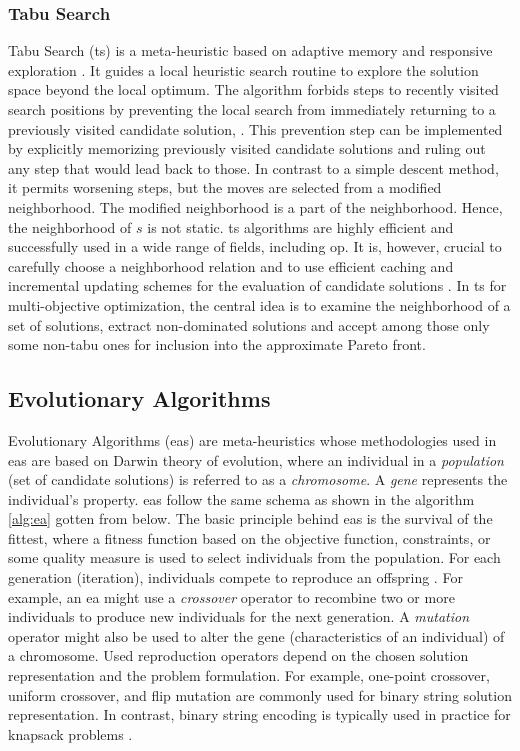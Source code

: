 \subsubsection{Tabu Search}
Tabu Search (\gls{ts}) is a meta-heuristic based on adaptive memory and responsive exploration \parencite{Gonzalez2007HandbookMetaheuristics}. It guides a local heuristic search routine to explore the solution
space beyond the local optimum. The algorithm forbids steps to recently visited search positions by preventing the local search from immediately returning to a previously visited candidate solution, \parencite{HolgerH2005StochasticSearch}. This prevention step can be implemented by explicitly memorizing previously visited candidate solutions and ruling out any step that would lead back to those. In contrast to a simple descent method, it permits worsening steps, but the moves are selected from a modified neighborhood. The modified neighborhood is a part of the neighborhood. Hence, the neighborhood of $s$ is not static. \Gls{ts} algorithms are highly efficient and successfully used in a wide range of fields, including \gls{op}. It is, however, crucial to carefully choose a neighborhood relation and to use efficient caching and incremental updating schemes for the evaluation of candidate solutions \parencite{HolgerH2005StochasticSearch}. In \gls{ts} for multi-objective optimization, the central idea is to examine the neighborhood of a set of solutions, extract non-dominated solutions and accept among those only some non-tabu ones for inclusion into the approximate Pareto front. 

\subsection{Evolutionary Algorithms}
Evolutionary Algorithms (\glspl{ea}) are meta-heuristics whose methodologies used in \glspl{ea} are based on Darwin theory of evolution, where an individual in a \textit{population} (set of candidate solutions) is referred to as a \textit{chromosome}. A \textit{gene} represents the individual's property. \glspl{ea} follow the same schema as shown in the algorithm \ref{alg:ea} gotten from \parencite{Gonzalez2007HandbookMetaheuristics} below. The basic principle behind \glspl{ea} is the survival of the fittest, where a fitness function based on the objective function, constraints, or some quality measure is used to select individuals from the population. For each generation (iteration), individuals compete to reproduce an offspring \parencite{Engelbrecht2007ComputationalEdition}. For example, an \gls{ea} might use a \textit{crossover} operator to recombine two or more individuals to produce new individuals for the next generation. A \textit{mutation} operator might also be used to alter the gene (characteristics of an individual) of a chromosome. Used reproduction operators depend on the chosen solution representation and the problem formulation. For example, one-point crossover, uniform crossover, and flip mutation are commonly used for binary string solution representation. In contrast, binary string encoding is typically used in practice for knapsack problems \parencite{Gonzalez2007HandbookMetaheuristics}.  

